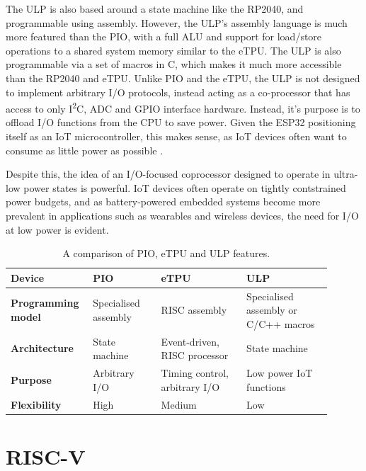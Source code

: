 The ULP is also based around a state machine like the RP2040, and programmable using assembly. However, the ULP's assembly language is much more featured than the PIO, with a full ALU and support for load/store operations to a shared system memory similar to the eTPU. The ULP is also programmable via a set of macros in C, which makes it much more accessible than the RP2040 and eTPU. Unlike PIO and the eTPU, the ULP is not designed to implement arbitrary I/O protocols, instead acting as a co-processor that has access to only I\textsuperscript{2}C, ADC and GPIO interface hardware. Instead, it's purpose is to offload I/O functions from the CPU to save power. Given the ESP32 positioning itself as an IoT microcontroller, this makes sense, as IoT devices often want to consume as little power as possible \cite{esp32}.

Despite this, the idea of an I/O-focused coprocessor designed to operate in ultra-low power states is powerful. IoT devices often operate on tightly contstrained power budgets, and as battery-powered embedded systems become more prevalent in applications such as wearables and wireless devices, the need for I/O at low power is evident.


\begin{table}[h!]
    \centering
    \begin{tabular}{|p{0.2\linewidth}|p{0.2\linewidth}|p{0.25\linewidth}|p{0.25\linewidth}|}
        \hline
        \textbf{Device}            & \textbf{PIO}         & \textbf{eTPU}                 & \textbf{ULP}                         \\ \hline
        \textbf{Programming model} & Specialised assembly & RISC assembly                 & Specialised assembly or C/C++ macros \\ \hline
        \textbf{Architecture}      & State machine        & Event-driven, RISC processor  & State machine                        \\ \hline
        \textbf{Purpose}           & Arbitrary I/O        & Timing control, arbitrary I/O & Low power IoT functions              \\ \hline
        \textbf{Flexibility}       & High                 & Medium                        & Low                                  \\ \hline
    \end{tabular}
    \caption{A comparison of PIO, eTPU and ULP features.}
    \label{tab:comparison}
\end{table}

\section{RISC-V}

